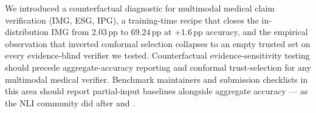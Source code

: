\documentclass{article}
\begin{document}
We introduced a counterfactual diagnostic for multimodal medical claim
verification (IMG, ESG, IPG), a training-time recipe that closes the
in-distribution IMG from $2.03$\,pp to $69.24$\,pp at $+1.6$\,pp
accuracy, and the empirical observation that inverted conformal
selection collapses to an empty trusted set on every evidence-blind
verifier we tested. Counterfactual evidence-sensitivity testing should
precede aggregate-accuracy reporting and conformal trust-selection for
any multimodal medical verifier. Benchmark maintainers and submission
checklists in this area should report partial-input baselines alongside
aggregate accuracy --- as the NLI community did after
\citet{gururangan2018annotation} and \citet{poliak2018hypothesis}.



\end{document}
